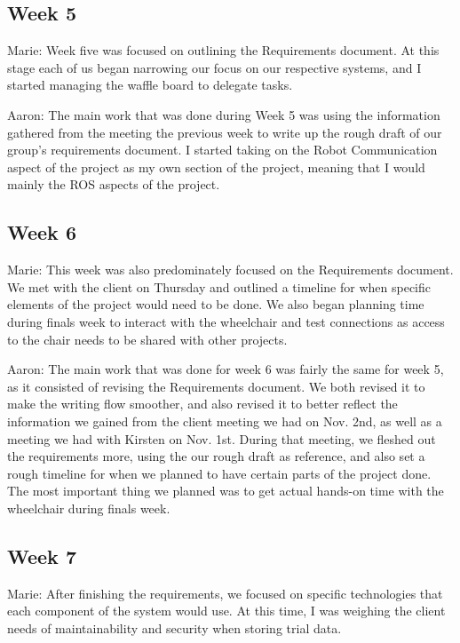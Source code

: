\documentclass[onecolumn, draftclsnofoot,10pt, compsoc]{IEEEtran}
\begin{document}
\subsection{Week 5}
Marie: Week five was focused on outlining the Requirements document. At this stage each of us began narrowing our focus on our respective systems, and I started managing the waffle board to delegate tasks.\par

Aaron: The main work that was done during Week 5 was using the information gathered from the meeting the previous week to write up the rough draft of our group's requirements document. I started taking on the Robot Communication aspect of the project as my own section of the project, meaning that I would mainly the ROS aspects of the project.\par

\subsection{Week 6}
Marie: This week was also predominately focused on the Requirements document. We met with the client on Thursday and outlined a timeline for when specific elements of the project would need to be done. We also began planning time during finals week to interact with the wheelchair and test connections as access to the chair needs to be shared with other projects.\par

Aaron: The main work that was done for week 6 was fairly the same for week 5, as it consisted of revising the Requirements document. We both revised it to make the writing flow smoother, and also revised it to better reflect the information we gained from the client meeting we had on Nov. 2nd, as well as a meeting we had with Kirsten on Nov. 1st. During that meeting, we fleshed out the requirements more, using the our rough draft as reference, and also set a rough timeline for when we planned to have certain parts of the project done. The most important thing we planned was to get actual hands-on time with the wheelchair during finals week.\par

\subsection{Week 7}
Marie: After finishing the requirements, we focused on specific technologies that each component of the system would use. At this time, I was weighing the client needs of maintainability and security when storing trial data.\par
\end{document}

